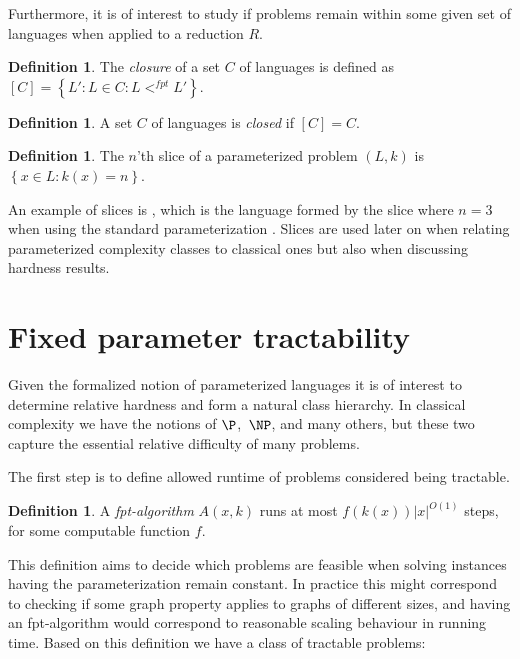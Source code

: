 \documentclass[a4paper,11pt]{report}
\theoremstyle{plain}
\theoremstyle{definition}
\newtheorem{defn}[thm]{Definition} %
\begin{document}
Furthermore, it is of interest to study if problems remain within some given set of languages when applied to a reduction $R$.

\begin{defn}
The \emph{closure} of a set $C$ of languages is defined as $\left[ C \right] = \left\{ L' : L \in C : L <^{fpt} L'\right\}$.
\end{defn}

\begin{defn}
A set $C$ of languages is \emph{closed} if $\left[ C \right] = C$.
\end{defn}

\begin{defn}
The $n$'th slice of a parameterized problem $(L, k)$ is $\left\{ x \in L : k(x) = n \right\}$.
\end{defn}

An example of slices is , which is the language formed by the slice where $n = 3$ when using the standard parameterization .
Slices are used later on when relating parameterized complexity classes to classical ones but also when discussing hardness results.

\section{Fixed parameter tractability}
Given the formalized notion of parameterized languages it is of interest to determine relative hardness and form a natural class hierarchy.
In classical complexity we have the notions of $\P$, $\NP$, and many others, but these two capture the essential relative difficulty of many problems.

The first step is to define allowed runtime of problems considered being tractable.

\begin{defn}
A \emph{fpt-algorithm} $A(x, k)$ runs at most $f(k(x)) |x|^{O(1)}$ steps, for some computable function $f$.
\end{defn}

This definition aims to decide which problems are feasible when solving instances having the parameterization remain constant.
In practice this might correspond to checking if some graph property applies to graphs of different sizes, and having an fpt-algorithm
would correspond to reasonable scaling behaviour in running time.
Based on this definition we have a class of tractable problems:
\end{document}
